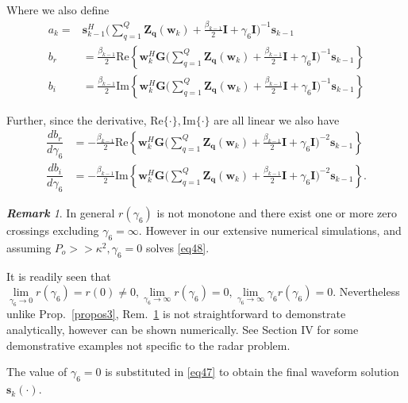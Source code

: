 \documentclass[11pt,draftclsnofoot,onecolumn]{IEEEtran}
\theoremstyle{definition}
\theoremstyle{remark}
\newtheorem{remk}{\bf Remark}
\begin{document}
 Where we also define
 \begin{align*}
 a_{k}=&\mathbf{s}_{k-1}^H\big( \sum\limits_{q=1}^Q\mathbf{Z_q}(\mathbf{w}_{k})+\frac{\beta_{k-1}}{2}\mathbf{I}+\gamma_6\mathbf{I}\big)^{-1} \mathbf{s}_{k-1} \\
 b_{r}&=\frac{\beta_{k-1}}{2}\mathrm{Re}\left\{ \mathbf{w}_{k}^H\mathbf{G} \big( \sum\limits_{q=1}^Q\mathbf{Z_q}(\mathbf{w}_{k})+\frac{\beta_{k-1}}{2}\mathbf{I}+\gamma_6\mathbf{I}\big)^{-1} \mathbf{s}_{k-1}\right\} \\
 b_{i}&=\frac{\beta_{k-1}}{2}\mathrm{Im}\left\{ \mathbf{w}_{k}^H\mathbf{G} \big( \sum\limits_{q=1}^Q\mathbf{Z_q}(\mathbf{w}_{k})+\frac{\beta_{k-1}}{2}\mathbf{I}+\gamma_6\mathbf{I}\big)^{-1} \mathbf{s}_{k-1}\right\}
 \end{align*}  
 
 Further, since the derivative, $\mathrm{Re}\{ \cdot\},\mathrm{Im}\{ \cdot\}$ are all linear we also have 
 \begin{align*}
 \dfrac{db_r}{d\gamma_6}&=-\frac{\beta_{k-1}}{2} \mathrm{Re}\left\{ \mathbf{w}_{k}^H\mathbf{G} \big( \sum\limits_{q=1}^Q\mathbf{Z_q}(\mathbf{w}_{k})+\frac{\beta_{k-1}}{2}\mathbf{I}+\gamma_6\mathbf{I}\big)^{-2} \mathbf{s}_{k-1}\right\} \\
 \dfrac{db_i}{d\gamma_6}&=-\frac{\beta_{k-1}}{2} \mathrm{Im}\left\{ \mathbf{w}_{k}^H\mathbf{G} \big( \sum\limits_{q=1}^Q\mathbf{Z_q}(\mathbf{w}_{k})+\frac{\beta_{k-1}}{2}\mathbf{I}+\gamma_6\mathbf{I}\big)^{-2} \mathbf{s}_{k-1}\right\}.
 \end{align*}

\begin{remk} \label{propos5}
In general $r(\gamma_6)$ is not monotone and there exist one or more zero crossings excluding $\gamma_6=\infty$. However in our extensive numerical simulations, and assuming $P_o>>\kappa^2, \gamma_6=0$ solves \eqref{eq48}.
\end{remk}

It is readily seen that $\lim \limits_{\gamma_6\rightarrow 0} r(\gamma_6)=r(0)\neq 0,\lim \limits_{\gamma_6\rightarrow \infty} r(\gamma_6)=0,\lim \limits_{\gamma_6\rightarrow \infty} \gamma_6 r(\gamma_6)=0$. Nevertheless unlike Prop.~\ref{propos3},  Rem.~\ref{propos5} is not straightforward  to demonstrate analytically, however can be shown numerically. See Section IV for some demonstrative examples not specific to the radar problem.  

The value of $\gamma_6=0$ is substituted in \eqref{eq47} to obtain the final waveform solution $\mathbf{s}_{k}(\cdot)$. 
\end{document}
